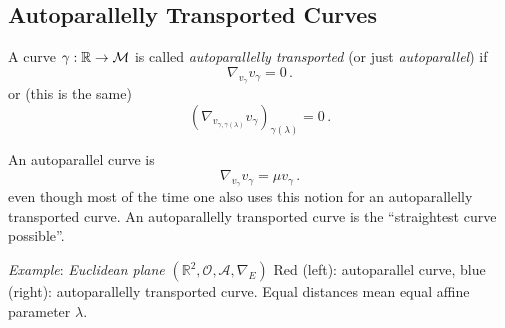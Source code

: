 \documentclass[11pt, a4paper, twocolumn]{article} %
\begin{document}
\subsection{Autoparallelly Transported Curves}
\begin{defn}
    A curve $\gamma: \mathbb{R} \to \mathcal{M}$ is called \textit{autoparallelly transported} (or just \textit{autoparallel}) if
    \begin{equation}
        \nabla_{v_\gamma} v_\gamma = 0\,.
    \end{equation}
    or (this is the same)
    \begin{equation}
        \left( \nabla_{v_{\gamma, \gamma(\lambda)}} v_\gamma \right)_{\gamma(\lambda)} = 0\,.
    \end{equation}
\end{defn}
\begin{note}
    An autoparallel curve is
    \begin{equation}
        \nabla_{v_\gamma} v_\gamma = \mu v_\gamma\,.
    \end{equation}
    even though most of the time one also uses this notion for an autoparallelly transported curve.
    An autoparallelly transported curve is the ``straightest curve possible''.
\end{note}
\textit{Example}: \textit{Euclidean plane} $(\mathbb{R}^2, \mathcal{O}, \mathcal{A}, \nabla_E)$
Red (left): autoparallel curve, blue (right): autoparallelly transported curve.
Equal distances mean equal affine parameter $\lambda$.
\begin{center}
\end{center}
\end{document}
